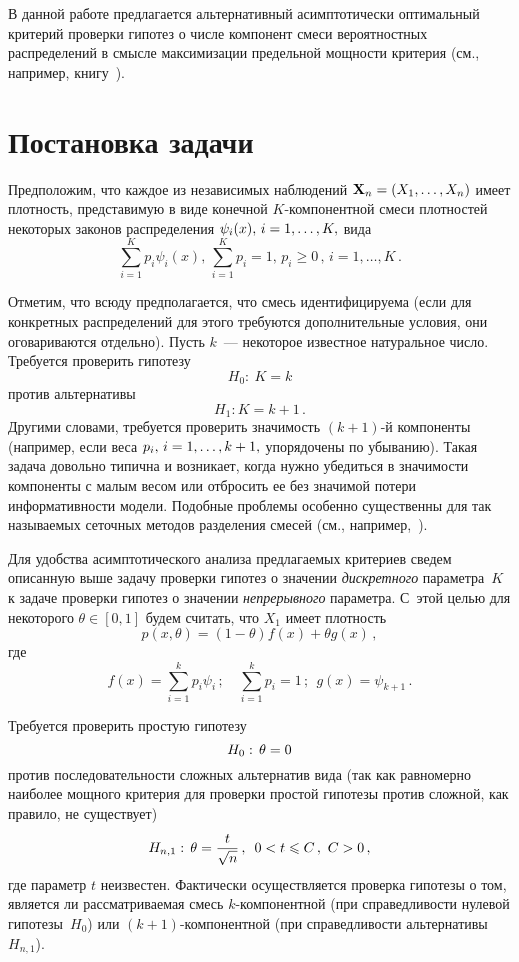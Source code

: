 \begin{multicols}{2}
В данной работе предлагается альтернативный асимптотически
оптимальный критерий проверки гипотез о числе компонент смеси
вероятностных распределений в смысле максимизации предельной
мощности критерия (см., например, книгу~\cite{Bening2000}).

\section{Постановка задачи}

Предположим, что каждое из независимых наблюдений
$\textbf{X}_n\hm=(X_1,\ldots,X_n)$ имеет плотность, представимую в виде
конечной $K$-ком\-по\-нент\-ной смеси плотностей некоторых законов
распределения $\psi_i(x),\,i\hm=1,\ldots,K,$ вида
$$
\sum_{i=1}^{K}p_i\psi_i(x),\,\sum_{i=1}^{K}p_i=1,\,p_i\geqslant0\,, \,i=1,\ldots,K\,.
$$

Отметим, что всюду предполагается, что смесь идентифицируема (если
для конкретных распределений для этого требуются дополнительные
условия, они оговариваются отдельно). Пусть $k$~--- некоторое
известное натуральное число. Требуется проверить гипотезу
$$
H_0:\ K=k
$$
против альтернативы
$$
H_1: K=k+1\,.
$$
Другими словами, требуется проверить значимость $(k+1)$-й компоненты
(например, если веса $p_i,\,i\hm=1,\ldots,k+1,$ упорядочены по
убыванию). Такая задача довольно типична и возникает, когда нужно
убедиться в значимости компоненты с малым весом или отбросить ее без
значимой потери информативности модели. Подобные проблемы особенно
существенны для так называемых сеточных методов разделения смесей
(см., например,~\cite{Korolev2007, Korolev2010}).

Для удобства асимптотического анализа предлагаемых критериев сведем
описанную выше задачу проверки гипотез о значении \textit{дискретного}
па\-ра\-мет\-ра~$K$ к задаче проверки гипотез о значении
\textit{непрерывного} параметра. С~этой целью для некоторого
$\theta\in[0,1]$ будем считать, что $X_1$ имеет плотность
\begin{equation}
\label{p} p(x,\theta)=(1-\theta) f(x)+\theta  g(x)\,,
\end{equation}
где
$$
f(x)=\sum\limits_{i=1}^{k}p_i\psi_i\,;\quad 
\sum\limits_{i=1}^{k}p_i=1\,;\ \  g(x)=\psi_{k+1}\,.
$$

Требуется проверить простую гипотезу
$$
H_0:\,\theta=0\\
$$
против последовательности сложных альтернатив вида (так
как равномерно наиболее мощного критерия для проверки простой
гипотезы против сложной, как правило, не существует)
$$
H_{n,1}:\,\theta=\displaystyle\frac{\displaystyle t\mathstrut}{\displaystyle \sqrt{n}\mathstrut}\,,\enskip 0<t\leqslant C\,,\  C>0\,,
$$
где параметр $t$ неизвестен. Фактически  осуществляется проверка
гипотезы о том, является ли рас\-смат\-ри\-ва\-емая смесь $k$-ком\-по\-нент\-ной
(при спра\-вед\-ли\-вости нулевой гипотезы~$H_0$) или $(k+1)$-ком\-по\-нент\-ной
(при справедливости альтернативы~$H_{n,1}$).
{

}
\end{multicols}
